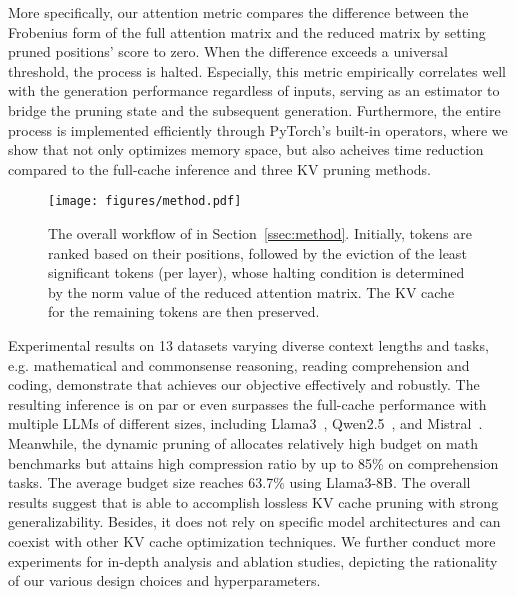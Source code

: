 More specifically, our attention metric compares the difference between the Frobenius form of the full attention matrix and the reduced matrix by setting pruned positions' score to zero. When the difference exceeds a universal threshold, the process is halted. Especially, this metric empirically correlates well with the generation performance regardless of inputs, serving as an estimator to bridge the pruning state and the subsequent generation.
Furthermore, the entire process is implemented efficiently through PyTorch's built-in operators, where we show that \method not only optimizes memory space, but also acheives time reduction compared to the full-cache inference and three KV pruning methods.

\begin{figure*}[!t]
   \centering
   \texttt{[image: figures/method.pdf]}
        \caption{The overall workflow of \method in Section~\ref{ssec:method}. Initially, tokens are ranked based on their positions, followed by the eviction of the least significant tokens (per layer), whose halting condition is determined by the norm value of the reduced attention matrix. The KV cache for the remaining tokens are then preserved.}
    \label{framework}
\end{figure*}

Experimental results on 13 datasets varying diverse context lengths and tasks, e.g. mathematical and commonsense reasoning, reading comprehension and coding, demonstrate that \method achieves our objective effectively and robustly.
The resulting inference is on par or even surpasses the full-cache performance with multiple LLMs of different sizes, including Llama3~\cite{DBLP:journals/corr/abs-2407-21783}, Qwen2.5~\cite{DBLP:journals/corr/abs-2412-15115}, and Mistral~\cite{DBLP:journals/corr/abs-2401-04088}.
Meanwhile, the dynamic pruning of \method allocates relatively high budget on math benchmarks but attains high compression ratio by up to 85\% on comprehension tasks. The average budget size reaches 63.7\% using Llama3-8B.
The overall results suggest that \method is able to accomplish lossless KV cache pruning with strong generalizability. Besides, it does not rely on specific model architectures and can coexist with other KV cache optimization techniques. We further conduct more experiments for in-depth analysis and ablation studies, depicting the rationality of our various design choices and hyperparameters.

